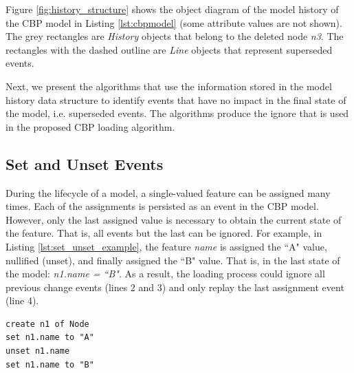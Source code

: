 \documentclass{llncs}
\begin{document}
Figure \ref{fig:history_structure} shows the object diagram of the model history of the CBP model in Listing \ref{lst:cbpmodel} (some attribute values are not shown). The grey rectangles are \emph{History} objects that belong to the deleted node \emph{n3}. The  rectangles with the dashed outline are \emph{Line} objects that represent superseded events.

Next, we present the algorithms that use the information stored in the model history data structure to identify events that have no impact in the final state of the model, i.e. superseded events. The algorithms produce the ignore that is used in the proposed CBP loading algorithm.

\subsection{Set and Unset Events}
\label{subsec:set_and_unset_events}
During the lifecycle of a model, a single-valued feature can be assigned many times.
Each of the assignments is persisted as an event in the CBP model.
However, only the last assigned value is necessary to obtain the current state of the feature. 
That is, all events but the last can be ignored.
For example, in Listing \ref{lst:set_unset_example}, the feature \emph{name} is assigned the ``A" value, nullified (unset), and finally assigned the ``B" value.
That is, in the last state of the model: \emph{n1.name = ``B"}.
As a result, the loading process could ignore all previous change events (lines 2 and 3) and only replay the last assignment event (line 4). 

\begin{lstlisting}[style=eol,caption={The CBP representation of attribute \emph{name} assignments.},label=lst:set_unset_example]
create n1 of Node
set n1.name to "A"
unset n1.name
set n1.name to "B"
\end{lstlisting}


\end{document}
